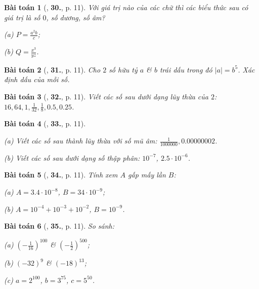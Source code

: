 \documentclass{article}
\numberwithin{equation}{section}
\newtheorem{baitoan}{Bài toán}[section]
\begin{document}
\begin{baitoan}[\cite{Binh_Toan_7_tap_1}, \textbf{30.}, p. 11]
	Với giá trị nào của các chữ thì các biểu thức sau có giá trị là số $0$, số dương, số âm?
	\begin{enumerate*}
		\item[(a)] $P = \frac{a^2b}{c}$;
		\item[(b)] $Q = \frac{x^3}{yz}$.
	\end{enumerate*}
\end{baitoan}

\begin{baitoan}[\cite{Binh_Toan_7_tap_1}, \textbf{31.}, p. 11]
	Cho $2$ số hữu tỷ $a$ \& $b$ trái dấu trong đó $|a| = b^5$. Xác định dấu của mỗi số.
\end{baitoan}

\begin{baitoan}[\cite{Binh_Toan_7_tap_1}, \textbf{32.}, p. 11]
	Viết các số sau dưới dạng lũy thừa của $2$: $16,64,1,\frac{1}{32},\frac{1}{8},0.5,0.25$.
\end{baitoan}

\begin{baitoan}[\cite{Binh_Toan_7_tap_1}, \textbf{33.}, p. 11]
	\begin{enumerate*}
		\item[(a)] Viết các số sau thành lũy thừa với số mũ âm: $\frac{1}{1000000},0.00000002$.
		\item[(b)] Viết các số sau dưới dạng số thập phân: $10^{-7}$, $2.5\cdot 10^{-6}$.
	\end{enumerate*}
\end{baitoan}

\begin{baitoan}[\cite{Binh_Toan_7_tap_1}, \textbf{34.}, p. 11]
	Tính xem $A$ gấp mấy lần $B$:
	\begin{enumerate*}
		\item[(a)] $A = 3.4\cdot 10^{-8}$, $B = 34\cdot 10^{-9}$;
		\item[(b)] $A = 10^{-4} + 10^{-3} + 10^{-2}$, $B = 10^{-9}$.
	\end{enumerate*}
\end{baitoan}

\begin{baitoan}[\cite{Binh_Toan_7_tap_1}, \textbf{35.}, p. 11]
	So sánh:
	\begin{enumerate*}
		\item[(a)] $\left(-\frac{1}{16}\right)^{100}$ \& $\left(-\frac{1}{2}\right)^{500}$;
		\item[(b)] $(-32)^9$ \& $(-18)^{13}$;
		\item[(c)] $a = 2^{100}$, $b = 3^{75}$, $c = 5^{50}$.
	\end{enumerate*}
\end{baitoan}
\end{document}
